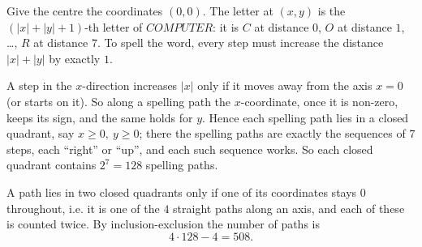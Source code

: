 Give the centre the coordinates $(0,0)$. The letter at $(x,y)$ is the $(|x|+|y|+1)$-th letter of $COMPUTER$: it is $C$ at distance $0$, $O$ at distance $1$, \dots, $R$ at distance $7$. To spell the word, every step must increase the distance $|x|+|y|$ by exactly $1$.

A step in the $x$-direction increases $|x|$ only if it moves away from the axis $x=0$ (or starts on it). So along a spelling path the $x$-coordinate, once it is non-zero, keeps its sign, and the same holds for $y$. Hence each spelling path lies in a closed quadrant, say $x\ge0,\ y\ge0$; there the spelling paths are exactly the sequences of $7$ steps, each ``right'' or ``up'', and each such sequence works. So each closed quadrant contains $2^7=128$ spelling paths.

A path lies in two closed quadrants only if one of its coordinates stays $0$ throughout, i.e. it is one of the $4$ straight paths along an axis, and each of these is counted twice. By inclusion-exclusion the number of paths is
\[
4\cdot128-4=\boxed{508}.
\]

